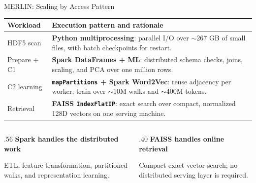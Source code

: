 \documentclass{beamer}
\begin{document}
\begin{frame}{MERLIN: Scaling by Access Pattern}

\small
\renewcommand{\arraystretch}{1.12}
\begin{tabular}{@{}>{\raggedright\arraybackslash}p{1.75cm}>{\raggedright\arraybackslash}p{8.75cm}@{}}
  \toprule
  \textbf{Workload} & \textbf{Execution pattern and rationale} \\
  \midrule
  HDF5 scan & \textbf{Python multiprocessing}: parallel I/O over $\sim$267 GB of small files, with batch checkpoints for restart. \\
  \addlinespace
  Prepare + C1 & \textbf{Spark DataFrames + ML}: distributed schema checks, joins, scaling, and PCA over one million rows. \\
  \addlinespace
  C2 learning & \textbf{\texttt{mapPartitions} + Spark Word2Vec}: reuse adjacency per worker; train over $\sim$10M walks and $\sim$400M tokens. \\
  \addlinespace
  Retrieval & \textbf{FAISS \texttt{IndexFlatIP}}: exact search over compact, normalized 128D vectors on one serving machine. \\
  \bottomrule
\end{tabular}

\vspace{.28cm}
\begin{columns}[T,onlytextwidth]
  \begin{column}{.56\textwidth}
    \textbf{Spark handles the distributed work}

    ETL, feature transformation, partitioned walks, and representation learning.
  \end{column}
  \begin{column}{.40\textwidth}
    \textbf{FAISS handles online retrieval}

    Compact exact vector search; no distributed serving layer is required.
  \end{column}
\end{columns}

\end{frame}
\end{document}
